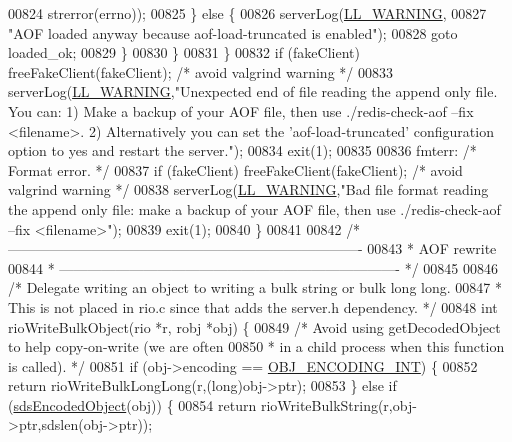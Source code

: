 \begin{DoxyCode}
{{{{{{{{{{{{{{{00824                     strerror(errno));
00825             \} \textcolor{keywordflow}{else} \{
00826                 serverLog(\hyperlink{server_8h_a31229b9334bba7d6be2a72970967a14b}{LL\_WARNING},
00827                     \textcolor{stringliteral}{"AOF loaded anyway because aof-load-truncated is enabled"});
00828                 \textcolor{keywordflow}{goto} loaded\_ok;
00829             \}
00830         \}
00831     \}
00832     \textcolor{keywordflow}{if} (fakeClient) freeFakeClient(fakeClient); \textcolor{comment}{/* avoid valgrind warning */}
00833     serverLog(\hyperlink{server_8h_a31229b9334bba7d6be2a72970967a14b}{LL\_WARNING},\textcolor{stringliteral}{"Unexpected end of file reading the append only file. You can: 1)
       Make a backup of your AOF file, then use ./redis-check-aof --fix <filename>. 2) Alternatively you can set the
       'aof-load-truncated' configuration option to yes and restart the server."});
00834     exit(1);
00835 
00836 fmterr: \textcolor{comment}{/* Format error. */}
00837     \textcolor{keywordflow}{if} (fakeClient) freeFakeClient(fakeClient); \textcolor{comment}{/* avoid valgrind warning */}
00838     serverLog(\hyperlink{server_8h_a31229b9334bba7d6be2a72970967a14b}{LL\_WARNING},\textcolor{stringliteral}{"Bad file format reading the append only file: make a backup of
       your AOF file, then use ./redis-check-aof --fix <filename>"});
00839     exit(1);
00840 \}
00841 
00842 \textcolor{comment}{/* ----------------------------------------------------------------------------}
00843 \textcolor{comment}{ * AOF rewrite}
00844 \textcolor{comment}{ * ------------------------------------------------------------------------- */}
00845 
00846 \textcolor{comment}{/* Delegate writing an object to writing a bulk string or bulk long long.}
00847 \textcolor{comment}{ * This is not placed in rio.c since that adds the server.h dependency. */}
00848 \textcolor{keywordtype}{int} rioWriteBulkObject(rio *r, robj *obj) \{
00849     \textcolor{comment}{/* Avoid using getDecodedObject to help copy-on-write (we are often}
00850 \textcolor{comment}{     * in a child process when this function is called). */}
00851     \textcolor{keywordflow}{if} (obj->encoding == \hyperlink{server_8h_ae934cf008a0be0ef009c92c2d006a816}{OBJ\_ENCODING\_INT}) \{
00852         \textcolor{keywordflow}{return} rioWriteBulkLongLong(r,(\textcolor{keywordtype}{long})obj->ptr);
00853     \} \textcolor{keywordflow}{else} \textcolor{keywordflow}{if} (\hyperlink{server_8h_afcfb5bd97af52d1dbce331745cae030c}{sdsEncodedObject}(obj)) \{
00854         \textcolor{keywordflow}{return} rioWriteBulkString(r,obj->ptr,sdslen(obj->ptr));
}}}}}}}}}}}}}}}
\end{DoxyCode}
